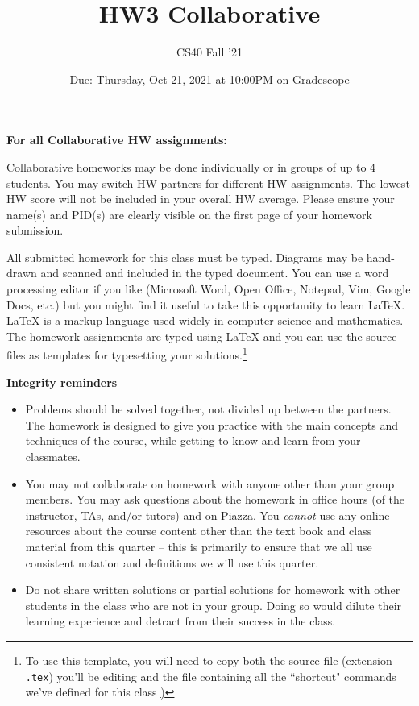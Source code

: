 \documentclass[12pt, oneside]{article}
\title{HW3 Collaborative}
\author{CS40 Fall '21}
\date{Due: Thursday, Oct 21, 2021 at 10:00PM on Gradescope}
\begin{document}
\maketitle

{\bf For all Collaborative HW assignments:}

Collaborative homeworks may be done individually or in groups of up to 4 students. You may switch HW partners for different HW assignments. The lowest HW score will not be included in your overall HW average. Please ensure your name(s) and PID(s) are clearly visible on the first page of your homework submission.

All submitted homework for this class must be typed. Diagrams may be hand-drawn and scanned and included in the typed document. You can use a word processing editor if you like (Microsoft Word, Open Office, Notepad, Vim, Google Docs, etc.) but you might find it useful to take this opportunity to learn LaTeX. LaTeX is a markup language used widely in computer science and mathematics. The homework assignments are typed using LaTeX and you can use the source files as templates for typesetting your solutions.\footnote{To use this template, you will need to copy both the source file (extension \texttt{.tex})  you'll be editing
and the file containing all the ``shortcut" commands we've defined for this class \href{https://drive.google.com/file/d/1FmQvgByKnNjTpIkAUw31TGWYrQZM-HK0/view?usp=sharing})}


{\bf Integrity reminders}
\begin{itemize}
\item Problems should be solved together, not divided up between the partners. The homework is
designed to give you practice with the main concepts and techniques of the course, while getting to know and learn from your classmates.
\item You may not collaborate on homework with anyone other than your group members.
You may ask questions about the homework in office hours (of the instructor, TAs, and/or tutors) and 
on Piazza.  You \emph{cannot} use any online resources about the course content other than the text
book and class material from this quarter -- this is primarily to ensure that we all use consistent notation and
definitions we will use this quarter.
\item Do not share written solutions or partial solutions for homework with other students in the class who are not in your group. Doing so would dilute their learning experience and detract from their success in the class.
\end{itemize}
\end{document}
